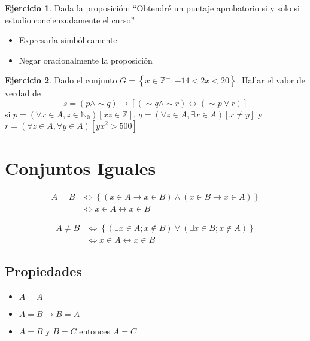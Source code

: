 \documentclass[16pt,]{krantz}
\providecommand{\tightlist}{%
  \setlength{\itemsep}{0pt}\setlength{\parskip}{0pt}}
\theoremstyle{definition}
\theoremstyle{definition}
\theoremstyle{definition}
\newtheorem{exercise}{Ejercicio}[chapter]
\theoremstyle{definition}
\theoremstyle{remark}
\begin{document}
\begin{exercise}
\protect\hypertarget{exr:unnamed-chunk-3}{}{\label{exr:unnamed-chunk-3} }Dada la proposición: ``Obtendré un puntaje aprobatorio si y solo si estudio concienzudamente el curso''

\begin{itemize}
\tightlist
\item
  Expresarla simbólicamente
\item
  Negar oracionalmente la proposición
\end{itemize}
\end{exercise}

\begin{exercise}
\protect\hypertarget{exr:unnamed-chunk-4}{}{\label{exr:unnamed-chunk-4} }Dado el conjunto \(G=\left\{x\in\mathbb{Z}^+:-14<2x<20\right\}\). Hallar el valor de verdad de \[
s=(p\wedge \sim q)\rightarrow[(\sim q\wedge \sim r)\leftrightarrow(\sim p\vee r)] 
\] si \(p=(\forall x\in A, z\in \mathbb{N_0})[xz\in \mathbb{Z}]\), \(q=(\forall z\in A, \exists x \in A)[x\neq y]\) y \(r=(\forall z\in A, \forall y \in A)[yx^2>500]\)
\end{exercise}

\hypertarget{conjuntos-iguales}{%
\section{Conjuntos Iguales}\label{conjuntos-iguales}}

\[\begin{aligned}A=B&\Longleftrightarrow \left\{(x\in A\rightarrow x\in B)\wedge(x\in B\rightarrow x\in A)\right\}\\
&\Longleftrightarrow x\in A \leftrightarrow x\in B 
\end{aligned}\]

\[\begin{aligned}A\neq B&\Longleftrightarrow \left\{(\exists x\in A; x\notin B)\vee(\exists x\in B; x\notin A)\right\}\\
&\Longleftrightarrow x\in A \leftrightarrow x\in B 
\end{aligned}\]

\hypertarget{propiedades}{%
\subsection{Propiedades}\label{propiedades}}

\begin{itemize}
\tightlist
\item
  \(A=A\)
\item
  \(A=B\rightarrow B=A\)
\item
  \(A=B\) y \(B=C\) entonces \(A=C\)
\end{itemize}
\end{document}
